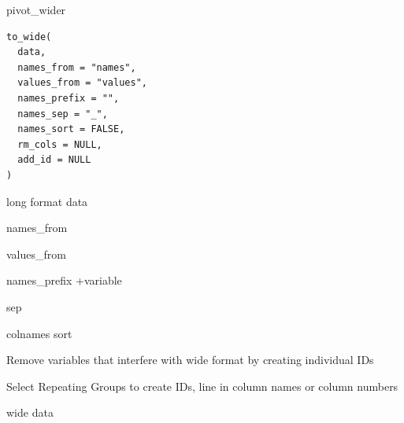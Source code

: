 \documentclass[a4paper]{book}
\begin{document}
%
\begin{Description}
pivot\_wider
\end{Description}
%
\begin{Usage}
\begin{verbatim}
to_wide(
  data,
  names_from = "names",
  values_from = "values",
  names_prefix = "",
  names_sep = "_",
  names_sort = FALSE,
  rm_cols = NULL,
  add_id = NULL
)
\end{verbatim}
\end{Usage}
%
\begin{Arguments}
\begin{ldescription}
\item[\code{data}] long format data

\item[\code{names\_from}] names\_from

\item[\code{values\_from}] values\_from

\item[\code{names\_prefix}] names\_prefix +variable

\item[\code{names\_sep}] sep

\item[\code{names\_sort}] colnames sort

\item[\code{rm\_cols}] Remove variables that interfere with wide format by creating individual IDs

\item[\code{add\_id}] Select Repeating Groups to create IDs, line in column names or column numbers
\end{ldescription}
\end{Arguments}
%
\begin{Value}
wide data
\end{Value}
%
\end{document}
